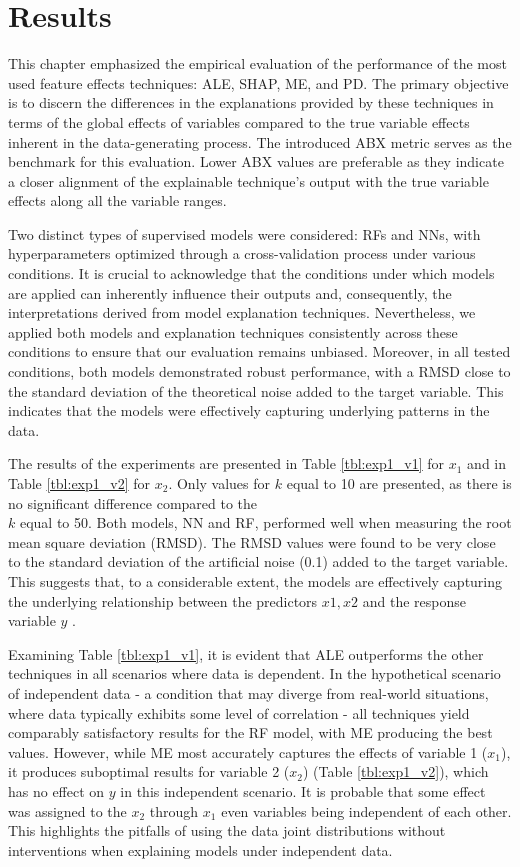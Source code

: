 \section{Results}

This chapter emphasized the empirical evaluation of the performance of the most used feature effects techniques: ALE, SHAP, ME, and PD. The primary objective is to discern the differences in the explanations provided by these techniques in terms of the global effects of variables compared to the true variable effects inherent in the data-generating process. The introduced ABX metric serves as the benchmark for this evaluation. Lower ABX values are preferable as they indicate a closer alignment of the explainable technique's output with the true variable effects along all the variable ranges.

Two distinct types of supervised models were considered: RFs and NNs, with hyperparameters optimized through a cross-validation process under various conditions. It is crucial to acknowledge that the conditions under which models are applied can inherently influence their outputs and, consequently, the interpretations derived from model explanation techniques. Nevertheless, we applied both models and explanation techniques consistently across these conditions to ensure that our evaluation remains unbiased. Moreover, in all tested conditions, both models demonstrated robust performance, with a RMSD close to the standard deviation of the theoretical noise added to the target variable. This indicates that the models were effectively capturing underlying patterns in the data.

The results of the experiments are presented in Table \ref{tbl:exp1_v1} for $x_1$ and in Table \ref{tbl:exp1_v2} for $x_2$. Only values for \(k\) equal to 10 are presented, as there is no significant difference compared to the \\\(k\) equal to 50. Both models, NN and RF, performed well when measuring the root mean square deviation (RMSD). The RMSD values were found to be very close to the standard deviation of the artificial noise (0.1) added to the target variable. This suggests that, to a considerable extent, the models are effectively capturing the underlying relationship between the predictors \(x1, x2\) and the response variable \(y\) . 



Examining Table \ref{tbl:exp1_v1}, it is evident that ALE outperforms the other techniques in all scenarios where data is dependent. In the hypothetical scenario of independent data - a condition that may diverge from real-world situations, where data typically exhibits some level of correlation - all techniques yield comparably satisfactory results for the RF model, with ME producing the best values. However, while ME most accurately captures the effects of variable 1 ($x_1$), it produces suboptimal results for variable 2 ($x_2$) (Table \ref{tbl:exp1_v2}), which has no effect on $y$ in this independent scenario. It is probable that some effect was assigned to the $x_2$ through $x_1$ even variables being independent of each other. This highlights the pitfalls of using the data joint distributions without interventions when explaining models under independent data.

